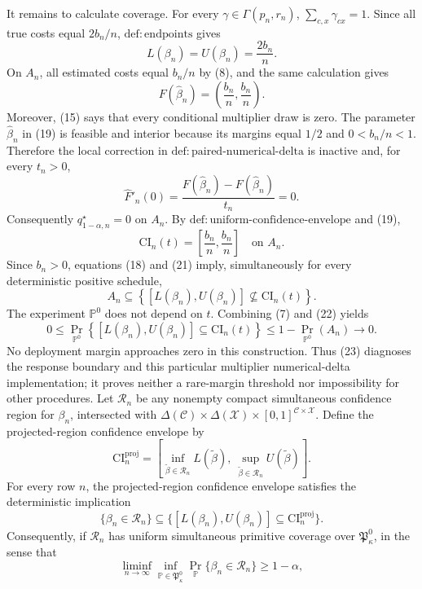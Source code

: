 It remains to calculate coverage.  For every \(\gamma\in\Gamma(p_n,r_n)\), \(\sum_{c,x}\gamma_{cx}=1\).  Since all true costs equal \(2b_n/n\), \(\mathrm{def:endpoints}\) gives
\[
L(\beta_n)=U(\beta_n)=\frac{2b_n}{n}.
\tag{18}
\]
On \(A_n\), all estimated costs equal \(b_n/n\) by (8), and the same calculation gives
\[
F(\widehat\beta_n)=\left(\frac{b_n}{n},\frac{b_n}{n}\right).
\tag{19}
\]
Moreover, (15) says that every conditional multiplier draw is zero.  The parameter \(\widehat\beta_n\) in (19) is feasible and interior because its margins equal \(1/2\) and \(0<b_n/n<1\).  Therefore the local correction in \(\mathrm{def:paired\text{-}numerical\text{-}delta}\) is inactive and, for every \(t_n>0\),
\[
\widehat F'_n(0)
=\frac{F(\widehat\beta_n)-F(\widehat\beta_n)}{t_n}
=0.
\tag{20}
\]
Consequently \(q_{1-\alpha,n}^\star=0\) on \(A_n\).  By \(\mathrm{def:uniform\text{-}confidence\text{-}envelope}\) and (19),
\[
\mathrm{CI}_n(t)=\left[\frac{b_n}{n},\frac{b_n}{n}\right]
\quad\text{on }A_n.
\tag{21}
\]
Since \(b_n>0\), equations (18) and (21) imply, simultaneously for every deterministic positive schedule,
\[
A_n\subseteq
\left\{[L(\beta_n),U(\beta_n)]\not\subseteq\mathrm{CI}_n(t)\right\}.
\tag{22}
\]
The experiment \(\mathbb P^0\) does not depend on \(t\).  Combining (7) and (22) yields
\[
0\leq
\Pr_{\mathbb P^0}\!\left\{
[L(\beta_n),U(\beta_n)]\subseteq\mathrm{CI}_n(t)
\right\}
\leq1-\Pr_{\mathbb P^0}(A_n)
\longrightarrow0.
\tag{23}
\]
No deployment margin approaches zero in this construction.  Thus (23) diagnoses the response boundary and this particular multiplier numerical-delta implementation; it proves neither a rare-margin threshold nor impossibility for other procedures.
Let \(\mathcal R_n\) be any nonempty compact simultaneous confidence region for \(\beta_n\), intersected with \(\Delta(\mathcal C)\times\Delta(\mathcal X)\times[0,1]^{\mathcal C\times\mathcal X}\).  Define the projected-region confidence envelope by
\[
\mathrm{CI}_n^{\mathrm{proj}}
=\left[
\inf_{\widetilde\beta\in\mathcal R_n}L(\widetilde\beta),
\ \sup_{\widetilde\beta\in\mathcal R_n}U(\widetilde\beta)
\right].
\]
For every row \(n\), the projected-region confidence envelope satisfies the deterministic implication
\[
\{\beta_n\in\mathcal R_n\}
\subseteq
\{[L(\beta_n),U(\beta_n)]\subseteq\mathrm{CI}_n^{\mathrm{proj}}\}.
\]
Consequently, if \(\mathcal R_n\) has uniform simultaneous primitive coverage over \(\mathfrak P_{\kappa}^{0}\), in the sense that
\[
\liminf_{n\to\infty}\inf_{\mathbb P\in\mathfrak P_{\kappa}^{0}}
\Pr_{\mathbb P}\{\beta_n\in\mathcal R_n\}\geq1-\alpha,
\]
